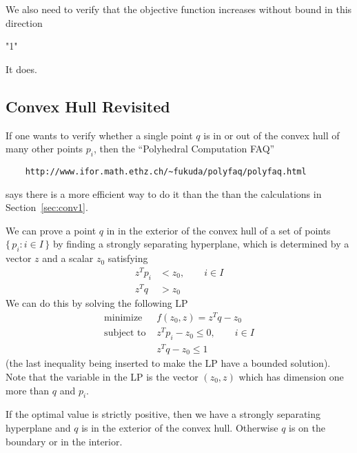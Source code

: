 \documentclass{article}
\newcommand{\set}[1]{\{\, #1 \,\}}
\begin{document}
We also need to verify that the objective function increases without
bound in this direction
\begin{Schunk}
\begin{Soutput}
[1] "1"
\end{Soutput}
\end{Schunk}
It does.

\subsection{Convex Hull Revisited} \label{sec:conv2}

If one wants to verify whether a single point $q$ is in or out
of the convex hull of many other points $p_i$, then the
``Polyhedral Computation FAQ''
\begin{verbatim}
    http://www.ifor.math.ethz.ch/~fukuda/polyfaq/polyfaq.html
\end{verbatim}
says there is a more efficient way to do it than the
than the calculations in Section~\ref{sec:conv1}.

We can prove a point $q$ in in the exterior of the convex hull of
a set of points $\set{ p_i : i \in I }$ by finding a strongly separating
hyperplane, which is determined by a vector $z$ and a scalar $z_0$
satisfying
\begin{align*}
    z^T p_i & < z_0, \qquad i \in I
    \\
    z^T q & > z_0
\end{align*}
We can do this by solving the following LP
\begin{align*}
    \text{minimize } & f(z_0, z) = z^T q - z_0
    \\
    \text{subject to } & z^T p_i - z_0 \le 0, \qquad i \in I
    \\
                       & z^T q - z_0 \le 1
\end{align*}
(the last inequality being inserted to make the LP have
a bounded solution).  Note that the variable in the LP is the
vector $(z_0, z)$ which has dimension one more than $q$ and $p_i$.

If the optimal value is strictly positive, then
we have a strongly separating hyperplane and $q$ is in the exterior of
the convex hull.
Otherwise $q$ is on the boundary or in the interior.
\end{document}
